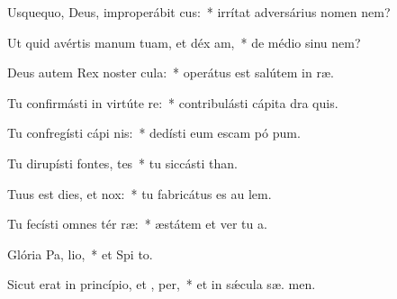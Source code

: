 \item Usquequo, Deus, improperábit cus:~* irrítat adversárius nomen   nem?
\item Ut quid avértis manum tuam, et déx am,~* de médio sinu   nem?
\item Deus autem Rex noster  cula:~* operátus est salútem in  ræ.
\item Tu confirmásti in virtúte  re:~* contribulásti cápita dra  quis.
\item Tu confregísti cápi nis:~* dedísti eum escam pó pum.
\item Tu dirupísti fontes,  tes~* tu siccásti  than.
\item Tuus est dies, et   nox:~* tu fabricátus es au  lem.
\item Tu fecísti omnes tér ræ:~* æstátem et ver tu  a.
\item Glória Pa,  lio,~* et Spi to.
\item Sicut erat in princípio, et ,  per,~* et in sǽcula sæ. men.
